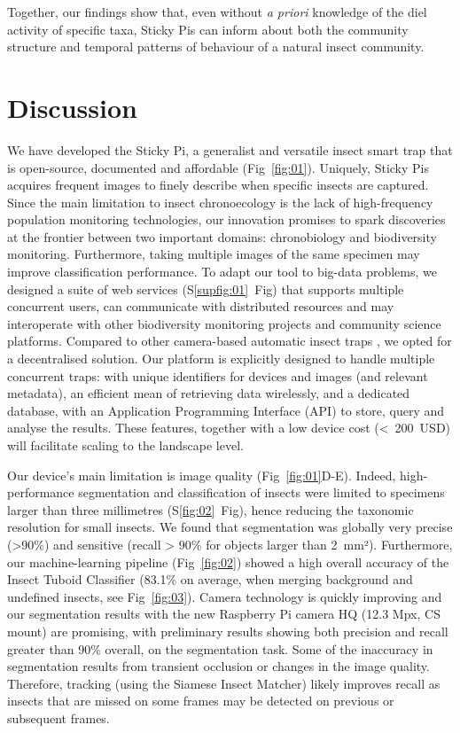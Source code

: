 \documentclass[12pt]{article}
\begin{document}
\begin{linenumbers}
		Together, our findings show that, even without \emph{a priori} knowledge of the diel activity of specific taxa, Sticky Pis can inform about both the community structure and temporal patterns of behaviour of a natural insect community.
		
		\section*{Discussion}
		
		
		We have developed the Sticky Pi, a generalist and versatile insect smart trap that is open-source, documented and affordable (Fig~\ref{fig:01}). Uniquely, Sticky Pis acquires frequent images to finely describe when specific insects are captured. Since the main limitation to insect chronoecology is the lack of high-frequency population monitoring technologies\cite{dominoni_methods_2017}, our innovation promises to spark discoveries at the frontier between two important domains: chronobiology and biodiversity monitoring. Furthermore, taking multiple images of the same specimen may improve classification performance. To adapt our tool to big-data problems, we designed a suite of web services (S\ref{supfig:01}~Fig) that supports multiple concurrent users, can communicate with distributed resources and may interoperate with other biodiversity monitoring projects and community science platforms\cite{pocock_chapter_2018}.
        Compared to other camera-based automatic insect traps \cite{bjerge_automated_2021}, we opted for a decentralised solution. 
		Our platform is explicitly designed to handle multiple concurrent traps: with unique identifiers for devices and images (and relevant metadata), an efficient mean of retrieving data wirelessly, and a dedicated database, with an Application Programming Interface (API) to store, query and analyse the results. These features, together with a low device cost (<~200~USD) will facilitate scaling to the landscape level.
		
		
		Our device’s main limitation is image quality (Fig~\ref{fig:01}D-E). Indeed, high-performance segmentation and classification of insects were limited to specimens larger than three millimetres (S\ref{fig:02}~Fig), hence reducing the taxonomic resolution for small insects. 
		We found that segmentation was globally very precise (>90\%) and sensitive (recall > 90\% for objects larger than 2~mm²). Furthermore, our machine-learning pipeline (Fig~\ref{fig:02}) showed a high overall accuracy of the Insect Tuboid Classifier (83.1\% on average, when merging background and undefined insects, see Fig~\ref{fig:03}). 
		Camera technology is quickly improving and our segmentation results with the new Raspberry Pi camera HQ (12.3 Mpx, CS mount) are promising, with preliminary results showing both precision and recall greater than 90\% overall, on the segmentation task.
		Some of the inaccuracy in segmentation results from transient occlusion or changes in the image quality. 
		Therefore, tracking (using the Siamese Insect Matcher) likely improves recall as insects that are missed on some frames may be detected on previous or subsequent frames.
		

\end{linenumbers}
\end{document}
